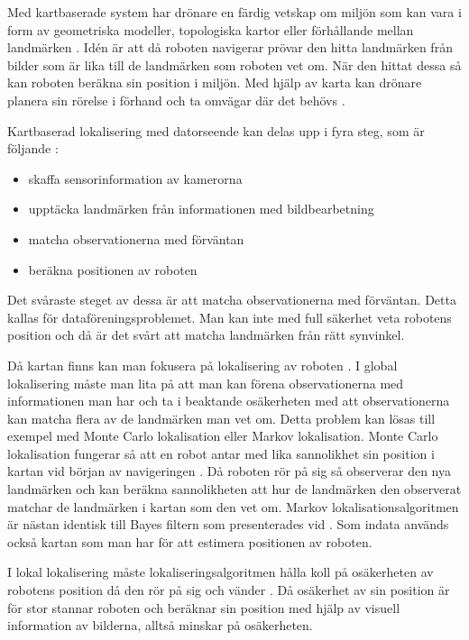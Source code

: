 Med kartbaserade system har drönare en färdig vetskap om miljön som kan vara i form av geometriska modeller, topologiska kartor eller förhållande mellan landmärken \citep{982903}. Idén är att då roboten navigerar prövar den hitta landmärken från bilder som är lika till de landmärken som roboten vet om. När den hittat dessa så kan roboten beräkna sin position i miljön. Med hjälp av karta kan drönare planera sin rörelse i förhand och ta omvägar där det behövs \citep{geospatial}. 

Kartbaserad lokalisering med datorseende kan delas upp i fyra steg, som är följande \citep{982903}:

\begin{itemize}
    \item skaffa sensorinformation av kamerorna
    \item upptäcka landmärken från informationen med bildbearbetning
    \item matcha observationerna med förväntan
    \item beräkna positionen av roboten
\end{itemize}

Det svåraste steget av dessa är att matcha observationerna med förväntan. Detta kallas för dataföreningsproblemet. Man kan inte med full säkerhet veta robotens position och då är det svårt att matcha landmärken från rätt synvinkel.

Då kartan finns kan man fokusera på lokalisering av roboten \citep{982903}. I global lokalisering måste man lita på att man kan förena observationerna med informationen man har och ta i beaktande osäkerheten med att observationerna kan matcha flera av de landmärken man vet om. Detta problem kan lösas till exempel med Monte Carlo lokalisation eller Markov lokalisation. Monte Carlo lokalisation fungerar så att en robot antar med lika sannolikhet sin position i kartan vid början av navigeringen \citep{montecarlo}. Då roboten rör på sig så observerar den nya landmärken och kan beräkna sannolikheten att hur de landmärken den observerat matchar de landmärken i kartan som den vet om. Markov lokalisationsalgoritmen är nästan identisk till Bayes filtern som presenterades vid  \citep{ProbabilisticRobotics}. Som indata används också kartan som man har för att estimera positionen av roboten.

I lokal lokalisering måste lokaliseringsalgoritmen hålla koll på osäkerheten av robotens position då den rör på sig och vänder \citep{montecarlo}. Då osäkerhet av sin position är för stor stannar roboten och beräknar sin position med hjälp av visuell information av bilderna, alltså minskar på osäkerheten.

